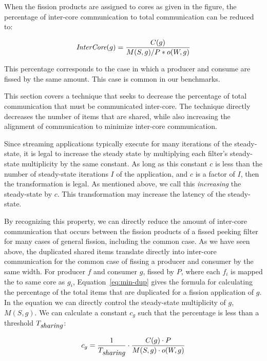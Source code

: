 When the fission products are assigned to
cores as given in the figure, the percentage of inter-core
communication to total communication can be reduced to:

\begin{equation}
\label{eq:min-dup}
\mt{InterCore}(g) = \frac{C(g)}{M(S,g) / P * o(W, g)}
\end{equation}

\noindent This percentage corresponds to the case in which a
producer and consume are fissed by the same amount.  This case is
common in our benchmarks.

This section covers a technique that seeks to decrease the percentage
of total communication that must be communicated inter-core.  The
technique directly decreases the number of items that are shared,
while also increasing the alignment of communication to minimize
inter-core communication.

Since streaming applications typically execute for
many iterations of the steady-state, it is legal to increase the
steady state by multiplying each filter's steady-state multiplicity by
the same constant.  As long as this constant $c$ is less than the number
of steady-state iterations $I$ of the application, and $c$ is a factor of
$I$, then the transformation is legal.  As mentioned above, we call
this {\it increasing} the steady-state by $c$.  This transformation
may increase the latency of the steady-state.

By recognizing this property, we can directly reduce the amount of
inter-core communication that occurs between the fission products of a
fissed peeking filter for many cases of general fission, including
the common case.  As we have seen above, the duplicated shared items
translate directly into inter-core communication for the common case
of fissing a producer and consumer by the same width.  For producer
$f$ and consumer $g$, fissed by $P$, where each $f_i$ is mapped the to
same core as $g_i$, Equation~\ref{eq:min-dup} gives the formula for
calculating the percentage of the total items that are duplicated for
a fission application of $g$.  In the equation we can directly control
the steady-state multiplicity of $g$, $M(S,g)$.  We can calculate a
constant $c_g$ such that the percentage is less than a threshold
$T_{\mbox{\it sharing}}$:

\begin{equation}
\label{eq:ic-thresh}
c_g = \frac{1}{T_{\mt{sharing}}} \cdot \frac{C(g) \cdot P}{M(S,g) \cdot o(W,g)}
\end{equation}


